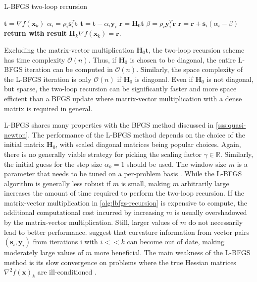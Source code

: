 \begin{algorithm}
\caption{L-BFGS two-loop recursion}\label{alg:lbfgs-recursion}
\begin{algorithmic}
\State $\bm{t} = \nabla f(\bm{x}_k)$
\State $\alpha_i = \rho_i \bm{s}^T_i \bm{t}$
\State $\bm{t} = \bm{t} - \alpha_i \bm{y}_i$
\EndFor
\State $\bm{r} = \bm{H}_0 \bm{t}$
\State $\beta = \rho_i \bm{y}^T_i \bm{r}$
\State $\bm{r} = \bm{r} + \bm{s}_i(\alpha_i - \beta)$
\EndFor
\State \textbf{return with result } $\bm{H}_k \nabla f(\bm{x}_k) = \bm{r}$.
\end{algorithmic}
\end{algorithm}

Excluding the matrix-vector multiplication $\bm{H}_0 \bm{t}$, the two-loop recursion scheme has time complexity $\mathcal{O}(n)$. Thus,
if $\bm{H}_0$ is chosen to be diagonal, the entire L-BFGS iteration can be computed in $\mathcal{O}(n)$. Similarly, the space complexity
of the L-BFGS iteration is only $\mathcal{O}(n)$ if $\bm{H}_0$ is diagonal. Even if $\bm{H}_0$ is not diagonal, but sparse, the two-loop
recursion can be significantly faster and more space efficient than a BFGS update where matrix-vector multiplication with a dense matrix
is required in general.

L-BFGS shares many properties with the BFGS method discussed in \cref{sss:quasi-newton}. The performance of the L-BFGS method depends 
on the choice of the initial matrix $\bm{H}_0$, with scaled diagonal matrices being popular choices. Again, there is no generally viable
strategy for picking the scaling factor $\gamma \in \mathbb{R}$. Similarly, the initial guess for the step size $\alpha_k=1$ should be used.
The window size $m$ is a parameter that needs to be tuned on a per-problem basis \cite{nocedal2006}. While the L-BFGS algorithm is 
generally less robust if
$m$ is small, making $m$ arbitrarily large increases the amount of time required to perform the two-loop recursion. If the matrix-vector
multiplication in \cref{alg:lbfgs-recursion} is expensive to compute, the additional computational cost incurred by increasing $m$ is 
usually overshadowed by the matrix-vector multiplication. Still, larger values of $m$ do not necessarily lead to better performance. 
\cite{liu2017} suggest that curvature information from vector pairs $(\bm{s}_i, \bm{y}_i)$ from iterations i with $i << k$ can become 
out of date, making moderately large values of $m$ more beneficial. The main weakness of the L-BFGS method is its slow convergence on 
problems where the true Hessian matrices $\nabla^2 f(\bm{x})_k$ are ill-conditioned \cite{nocedal2006}.

